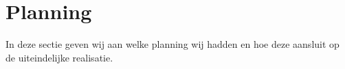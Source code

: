 \section{Planning}
\label{Planning}

In deze sectie geven wij aan welke planning wij hadden en hoe deze aansluit op de uiteindelijke realisatie. 
